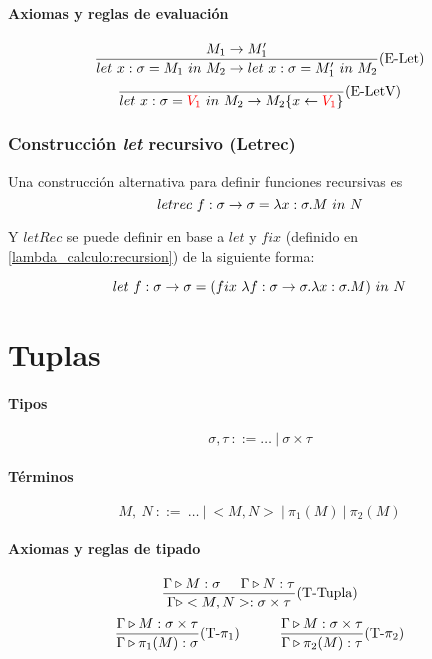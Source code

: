 \paragraph{Axiomas y reglas de evaluación}

\begin{equation*}
\frac{M_1\to M_1'}{let~x:\sigma = M_1~in~M_2\to let~x:\sigma = M'_1~in~M_2}(\text{E-Let})
\end{equation*}
\vspace*{5mm}
\begin{equation*}
\frac{}{let~x:\sigma = \color{red}V_1\color{black}~in~M_2\to M_2\{x\leftarrow\color{red}V_1\color{black}\}}(\text{E-LetV})
\end{equation*}

\subsubsection{Construcción \textit{let} recursivo (Letrec)}
Una construcción alternativa para definir funciones recursivas es 
$$letrec~f:\sigma\to\sigma = \lambda x: \sigma . M~in~N$$

Y $letRec$ se puede definir  en base a $let$ y $fix$ (definido en \ref{lambda_calculo:recursion}) de la siguiente forma:

$$let~f:\sigma\to\sigma = (fix~\lambda f: \sigma\to\sigma . \lambda x: \sigma . M)~in~N$$

\section{Tuplas}

\paragraph{Tipos}
$$\sigma,\tau~::= \dots~|~\sigma\times\tau$$

\paragraph{Términos}
$$M,~N~::=~\dots~|~<M,N>~|~\pi_1(M)~|~\pi_2(M)$$
\paragraph{Axiomas y reglas de tipado}
\begin{equation*}
    \frac{\Gamma\triangleright M : \sigma\hspace*{5mm}\Gamma\triangleright N : \tau}{\Gamma\triangleright <M,N> : \sigma\times\tau}(\text{T-Tupla})
\end{equation*}
\vspace*{5mm}
\begin{equation*}
\frac{\Gamma\triangleright M : \sigma\times\tau}{\Gamma\triangleright \pi_1(M) : \sigma}(\text{T-}\pi_1)\hspace*{1cm}\frac{\Gamma\triangleright M : \sigma\times\tau}{\Gamma\triangleright \pi_2(M) : \tau}(\text{T-}\pi_2)
\end{equation*}

